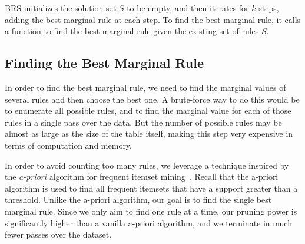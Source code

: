 \documentclass[10pt,journal,compsoc]{IEEEtran}
\begin{document}
BRS initializes the solution set $S$ to be empty, and then iterates for $k$ steps, adding the best marginal rule at each step. To find the best marginal rule, it calls a function to find the best marginal rule given the existing set of rules $S$. 

\subsection{Finding the Best Marginal Rule}\label{sec:finding-best-marginal}
In order to find the best marginal rule, we need to find the marginal values of several rules and then choose the best one. A brute-force way to do this would be to enumerate all possible rules, and to find the marginal value for each of those rules in a single pass over the data. But the number of possible rules may be almost as large as the size of the table itself, making this step very expensive in terms of computation and memory. 

In order to avoid counting too many rules, we leverage a technique inspired by the {\em a-priori} algorithm for frequent itemset mining~\cite{apriori}. Recall that the a-priori algorithm is used to find all frequent itemsets that have a support greater than a threshold. Unlike the a-priori algorithm, our goal is to find the single best marginal rule. Since we only aim to find one rule at a time, our pruning power is significantly higher than a vanilla a-priori algorithm, and we terminate in much fewer passes over the dataset. 
\end{document}
